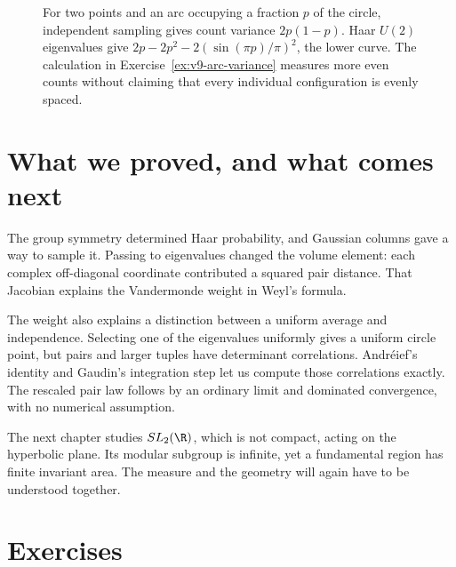 \begin{figure}[ht]
\centering
{}
\caption{For two points and an arc occupying a fraction $p$ of the circle, independent sampling gives count variance $2p(1-p)$. Haar $U(2)$ eigenvalues give $2p-2p^2-2(\sin(\pi p)/\pi)^2$, the lower curve. The calculation in Exercise~\ref{ex:v9-arc-variance} measures more even counts without claiming that every individual configuration is evenly spaced.}
\label{fig:v9-count-variance}
\end{figure}

\section{What we proved, and what comes next}

The group symmetry determined Haar probability, and Gaussian columns gave
a way to sample it. Passing to eigenvalues changed the volume element:
each complex off-diagonal coordinate contributed a squared pair distance.
That Jacobian explains the Vandermonde weight in Weyl's formula.

The weight also explains a distinction between a uniform average and
independence. Selecting one of the eigenvalues uniformly gives a uniform circle point,
but pairs and larger tuples have determinant correlations.
Andr\'eief's identity and Gaudin's integration step let us compute those
correlations exactly. The rescaled pair law follows by an ordinary limit
and dominated convergence, with no numerical assumption.

The next chapter studies $SL_2(\R)$, which is not compact, acting on the
hyperbolic plane. Its modular subgroup is infinite, yet a fundamental
region has finite invariant area. The measure and the geometry will
again have to be understood together.

\section{Exercises}

